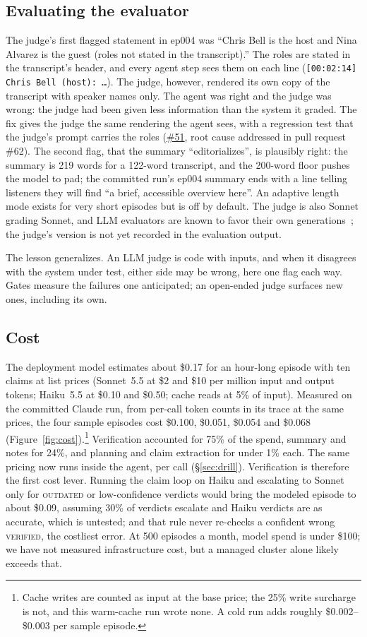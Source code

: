 \documentclass[11pt]{article}
\newcommand{\code}[1]{\texttt{#1}}
\newcommand{\V}{\textsc{verified}}
\newcommand{\Ou}{\textsc{outdated}}
\newcommand{\gh}[1]{\href{https://github.com/Organized-AI/podcast-agent/issues/#1}{\##1}}
\begin{document}
\subsection{Evaluating the evaluator}\label{sec:judge}
The judge's first flagged statement in ep004 was ``Chris Bell is the host and Nina Alvarez is the guest (roles not stated in the transcript).'' The roles are stated in the transcript's header, and every agent step sees them on each line (\code{[00:02:14] Chris Bell (host): \ldots}). The judge, however, rendered its own copy of the transcript with speaker names only. The agent was right and the judge was wrong: the judge had been given less information than the system it graded. The fix gives the judge the same rendering the agent sees, with a regression test that the judge's prompt carries the roles (\gh{51}, root cause addressed in pull request \#62). The second flag, that the summary ``editorializes'', is plausibly right: the summary is 219 words for a 122-word transcript, and the 200-word floor pushes the model to pad; the committed run's ep004 summary ends with a line telling listeners they will find ``a brief, accessible overview here''. An adaptive length mode exists for very short episodes but is off by default. The judge is also Sonnet grading Sonnet, and LLM evaluators are known to favor their own generations~\citep{panickssery2024}; the judge's version is not yet recorded in the evaluation output.

The lesson generalizes. An LLM judge is code with inputs, and when it disagrees with the system under test, either side may be wrong, here one flag each way. Gates measure the failures one anticipated; an open-ended judge surfaces new ones, including its own.

\subsection{Cost}
The deployment model estimates about \$0.17 for an hour-long episode with ten claims at list prices (Sonnet~5.5 at \$2 and \$10 per million input and output tokens; Haiku~5.5 at \$0.10 and \$0.50; cache reads at 5\% of input). Measured on the committed Claude run, from per-call token counts in its trace at the same prices, the four sample episodes cost \$0.100, \$0.051, \$0.054 and \$0.068 (Figure~\ref{fig:cost}).\footnote{Cache writes are counted as input at the base price; the 25\% write surcharge is not, and this warm-cache run wrote none. A cold run adds roughly \$0.002--\$0.003 per sample episode.} Verification accounted for 75\% of the spend, summary and notes for 24\%, and planning and claim extraction for under 1\% each. The same pricing now runs inside the agent, per call (\S\ref{sec:drill}). Verification is therefore the first cost lever. Running the claim loop on Haiku and escalating to Sonnet only for \Ou{} or low-confidence verdicts would bring the modeled episode to about \$0.09, assuming 30\% of verdicts escalate and Haiku verdicts are as accurate, which is untested; and that rule never re-checks a confident wrong \V{}, the costliest error. At 500 episodes a month, model spend is under \$100; we have not measured infrastructure cost, but a managed cluster alone likely exceeds that.
\end{document}
